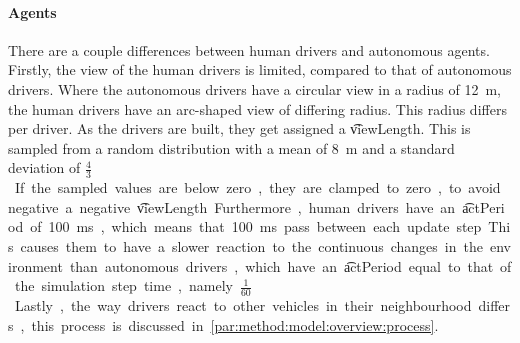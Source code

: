 

\paragraph{Agents}
There are a couple differences between human drivers and autonomous agents. Firstly, the view of the human drivers is limited, compared to that of autonomous drivers. Where the autonomous drivers have a circular view in a radius of \si{12 \meter}, the human drivers have an arc-shaped view of differing radius. This radius differs per driver. As the drivers are built, they get assigned a \t{viewLength}. This is sampled from a random distribution with a mean of \si{8 \meter} and a standard deviation of \si{$\frac{4}{3}$ \meter}. If the sampled values are below zero, they are clamped to zero, to avoid negative a negative \t{viewLength}. 

Furthermore, human drivers have an \t{actPeriod} of \si{100\milli\second}, which means that \si{100\milli\second} pass between each update step. This causes them to have a slower reaction to the continuous changes in the environment than autonomous drivers, which have an \t{actPeriod} equal to that of the simulation step time, namely\si{$\frac{1}{60}$ \second}. 

Lastly, the way drivers react to other vehicles in their neighbourhood differs, this process is discussed in  \cref{par:method:model:overview:process}. 



